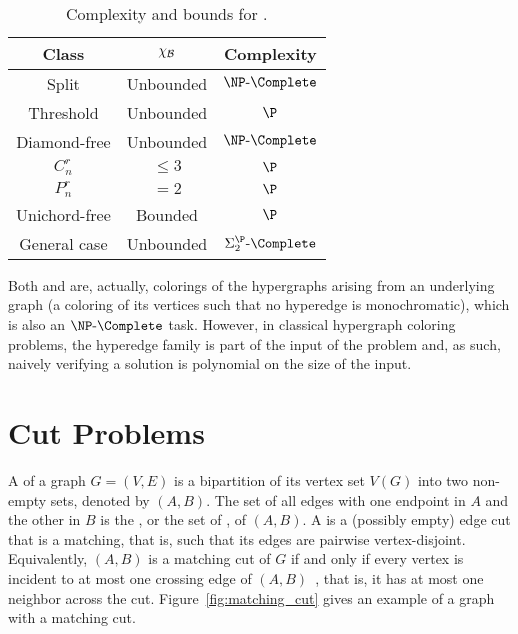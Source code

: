 \begin{table}[!htb]
    \centering
    \begin{tabular}{c|c|c}
        \hline
        \hline
        Class            & $\chi_{\mathcal{B}}$             & Complexity \\
        \hline
        Split            & Unbounded            & $\NPc$\\
        Threshold        & Unbounded            & $\P$\\
        Diamond-free     & Unbounded            & $\NPc$\\
        $C_n^r$          & $\leq 3$             & $\P$\\
        $P_n^r$          & $= 2$                & $\P$\\
        Unichord-free    & Bounded              & $\P$\\
        General case     & Unbounded            & $\SiP{2}\text{-}\Complete$\\
        \hline
        \hline
    \end{tabular}
    \caption{Complexity and bounds for .}
    \label{tab:biclique_color_complexity}
\end{table}

Both  and  are, actually, colorings of the hypergraphs arising from an underlying graph (a coloring of its vertices such that no hyperedge is monochromatic), which is also an $\NPc$ task.
However, in classical hypergraph coloring problems, the hyperedge family is part of the input of the problem and, as such, naively verifying a solution is polynomial on the size of the input.

\section{Cut Problems}

A  of a graph $G = (V, E)$ is a bipartition of its vertex set $V(G)$ into two non-empty sets, denoted by $(A,B)$.
The set of all edges with one endpoint in $A$ and the other in $B$ is the , or the set of , of $(A,B)$.
A  is a (possibly empty) edge cut that is a matching, that is, such that its edges are pairwise vertex-disjoint. Equivalently, $(A, B)$ is a matching cut of $G$ if and only if every vertex is incident to at most one crossing edge of $(A, B)$~\citep{matching_cut_graham, chvatal_matching_cut}, that is, it has at most one neighbor across the cut.
Figure~\ref{fig:matching_cut} gives an example of a graph with a matching cut.


